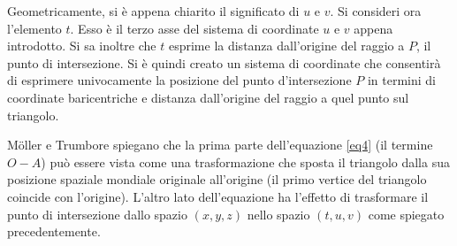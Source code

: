 Geometricamente, si è appena chiarito il significato di $u$ e $v$. Si consideri ora l'elemento $t$. Esso è il terzo asse del sistema di coordinate $u$ e $v$ appena introdotto. Si sa inoltre che $t$ esprime la distanza dall'origine del raggio a $P$, il punto di intersezione. Si è quindi creato un sistema di coordinate che consentirà di esprimere univocamente la posizione del punto d'intersezione $P$ in termini di coordinate baricentriche e distanza dall'origine del raggio a quel punto sul triangolo.

M\"oller e Trumbore spiegano che la prima parte dell'equazione \ref{eq4} (il termine $O-A$) può essere vista come una trasformazione che sposta il triangolo dalla sua posizione spaziale mondiale originale all'origine (il primo vertice del triangolo coincide con l'origine). L'altro lato dell'equazione ha l'effetto di trasformare il punto di intersezione dallo spazio $(x,y,z)$ nello spazio $(t,u,v)$ come spiegato precedentemente.

